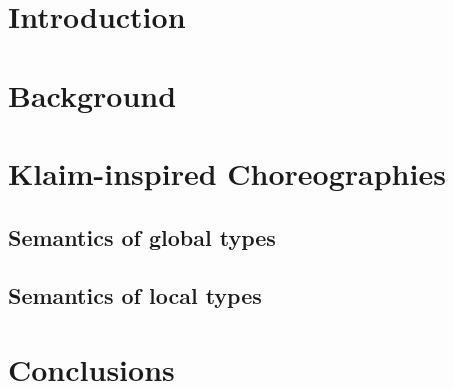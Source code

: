 \documentclass[runningheads,a4paper]{llncs}
\begin{document}
\section{Introduction}
\label{sec:intro}


\section{Background}
\label{sec:background}


\section{Klaim-inspired Choreographies}
\label{sec:klaimographies}


\subsection{Semantics of global types}
\label{sec:globsem}


\subsection{Semantics of local types}
\label{sec:locsem}

  
\section{Conclusions}
\label{sec:disc}\label{sec:conc}




\end{document}
